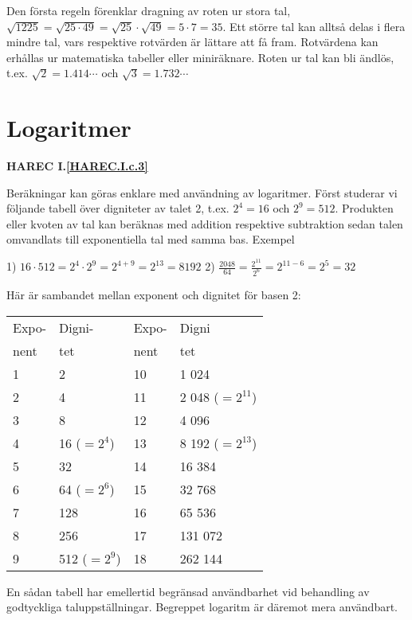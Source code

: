 Den första regeln förenklar dragning av roten ur stora tal,
\(\sqrt{1225} = \sqrt{25 \cdot 49} = \sqrt{25} \cdot \sqrt{49} = 5 \cdot 7 = 35\).
Ett större tal kan alltså delas i flera mindre tal, vars respektive rotvärden är
lättare att få fram. Rotvärdena kan erhållas ur matematiska tabeller eller
miniräknare.
Roten ur tal kan bli ändlös, t.ex.
\(\sqrt{2} = 1.414\cdots\) och \(\sqrt{3} = 1.732\cdots\)

\section{Logaritmer}
\label{logaritmer}
\textbf{HAREC I.\ref{HAREC.I.c.3}\label{myHAREC.I.c.3}}

Beräkningar kan göras enklare med användning av logaritmer.
Först studerar vi följande tabell över digniteter av talet 2,
t.ex. \(2^4 = 16\) och \(2^9 = 512\).
Produkten eller kvoten av tal kan beräknas med addition respektive subtraktion
sedan talen omvandlats till exponentiella tal med samma bas.
Exempel

1) \(16 \cdot 512 = 2^4 \cdot 2^9 =2^{4+9} = 2^{13} = 8192\)
2) \(\frac{2048}{64} = \frac{2^{11}}{2^6} =2^{11-6} =2^5 = 32\)

Här är sambandet mellan exponent och dignitet för basen 2:

\begin{tabular}{ll|ll}
Expo- & Digni-       & Expo- & Digni            \\
nent  & tet          & nent  & tet              \\ \hline
1     & 2            & 10    & 1 024            \\
2     & 4            & 11    & 2 048 (\(=2^{11}\)) \\
3     & 8            & 12    & 4 096            \\
4     & 16 (\(=2^4\))  & 13    & 8 192 (\(=2^{13}\)) \\
5     & 32           & 14    & 16 384           \\
6     & 64 (\(=2^6\))  & 15    & 32 768           \\
7     & 128          & 16    & 65 536           \\
8     & 256          & 17    & 131 072          \\
9     & 512 (\(=2^9\)) & 18    & 262 144
\end{tabular}

En sådan tabell har emellertid begränsad
användbarhet vid behandling av godtyckliga
taluppställningar. Begreppet logaritm är däremot mera användbart.

